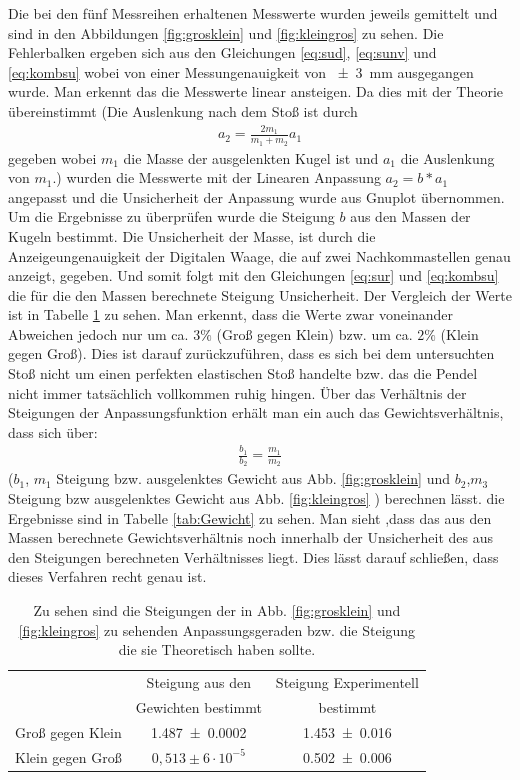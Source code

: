 Die bei den fünf Messreihen erhaltenen Messwerte wurden jeweils gemittelt und sind in den Abbildungen \ref{fig:grosklein} und \ref{fig:kleingros} zu sehen. Die Fehlerbalken ergeben sich aus den Gleichungen \ref{eq:sud}, \ref{eq:sunv} und \ref{eq:kombsu} wobei von einer Messungenauigkeit von \SI{+-3}{mm} ausgegangen wurde.
Man erkennt das die Messwerte linear ansteigen. Da dies mit der Theorie übereinstimmt (Die Auslenkung nach dem Stoß ist durch
\begin{align}
	a_2= \frac{2m_1}{m_1+m_2} a_1\label{eq:Auslenkung}
\end{align} 
gegeben wobei $m_1$ die Masse der ausgelenkten Kugel ist und $a_1$ die Auslenkung von $m_1$.)
wurden die Messwerte mit der Linearen Anpassung $a_2=b*a_1$ angepasst und die Unsicherheit der Anpassung wurde aus Gnuplot übernommen.
Um die Ergebnisse zu überprüfen wurde die Steigung $b$ aus den Massen der Kugeln bestimmt. Die Unsicherheit der Masse, ist durch die Anzeigeungenauigkeit der Digitalen Waage, die auf zwei Nachkommastellen genau anzeigt, gegeben. Und somit folgt mit den Gleichungen \ref{eq:sur} und \ref{eq:kombsu} die für die den Massen berechnete Steigung Unsicherheit. Der Vergleich der Werte ist in Tabelle \ref{tab:steigung} zu sehen.
Man erkennt, dass die Werte zwar voneinander Abweichen jedoch nur um ca. $3\%$ (Groß gegen Klein) bzw. um ca. $2\%$ (Klein gegen Groß). Dies ist darauf zurückzuführen, dass es sich bei dem untersuchten Stoß nicht um einen perfekten elastischen Stoß handelte bzw. das die Pendel nicht immer tatsächlich vollkommen ruhig hingen.
Über das Verhältnis der Steigungen der Anpassungsfunktion erhält man ein auch das Gewichtsverhältnis, dass sich über: 
\begin{align}
\frac{b_1}{b_2}=\frac{m_1}{m_2}	
\end{align} 
($b_1$, $m_1$ Steigung bzw. ausgelenktes Gewicht aus Abb. \ref{fig:grosklein} und $b_2$,$m_3$ Steigung bzw ausgelenktes Gewicht aus Abb. \ref{fig:kleingros} ) berechnen lässt. die Ergebnisse sind in Tabelle \ref{tab:Gewicht} zu sehen.
Man sieht ,dass das aus den Massen berechnete Gewichtsverhältnis  noch innerhalb der Unsicherheit des aus den Steigungen berechneten Verhältnisses liegt. Dies lässt darauf schließen, dass dieses Verfahren recht genau ist.

\begin{table}[h]
	\caption{Zu sehen sind die Steigungen der in Abb. \ref{fig:grosklein} und \ref{fig:kleingros} zu sehenden Anpassungsgeraden bzw. die Steigung die sie Theoretisch haben sollte.}
	\begin{tabular}{|c|c|c|}
		\hline
		& Steigung aus den & Steigung Experimentell\\
		& Gewichten bestimmt & bestimmt\\
		\hline
		Groß gegen Klein &  \SI{1,487+-0,0002}{} & \SI{1,453+-0,016}{} \\
		\hline
		Klein gegen Groß & $0,513 \pm 6 \cdot 10^{-5}$&\SI{0,502+-0,006}{}\\
		\hline
	\end{tabular}
\label{tab:steigung}
\end{table}


